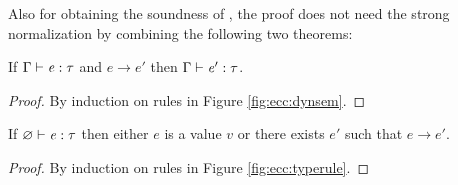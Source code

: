 Also for obtaining the soundness of \expcc, the proof does not need the strong normalization by combining the following two theorems:

\begin{thm}
  If $\Gamma  \vdash  \mathit{e}  :  \tau$ and $e  \longrightarrow  e'$ then $\Gamma  \vdash  \mathit{e'}  :  \tau$.
\end{thm}

\begin{proof}
	By induction on rules in Figure \ref{fig:ecc:dynsem}.
\end{proof}

\begin{thm}[Progress]
  If $\varnothing  \vdash  \mathit{e}  :  \tau$ then either $e$ is a value $v$ or there exists
  $e'$ such that $e  \longrightarrow  e'$.
\end{thm}

\begin{proof}
	By induction on rules in Figure \ref{fig:ecc:typerule}.
\end{proof}

